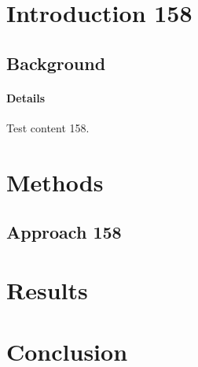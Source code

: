 \documentclass{article}
\begin{document}
\section{Introduction 158}
\subsection{Background}
\paragraph{Details} Test content 158.
\section{Methods}
\subsection{Approach 158}
\section{Results}
\section{Conclusion}
\end{document}
